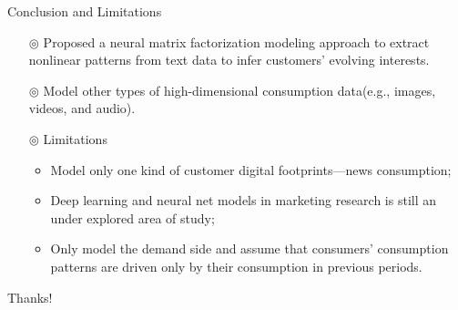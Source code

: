 \documentclass{beamer}
\begin{document}
\begin{frame}{Conclusion and Limitations}
	\begin{itemize}
		\item[$\circledcirc$] Proposed a neural matrix factorization modeling approach to extract nonlinear patterns from text data to infer customers' evolving interests.
		\item[$\circledcirc$] Model other types of high-dimensional consumption data(e.g., images, videos, and audio).
		\item[$\circledcirc$] Limitations
		      \begin{itemize}
			      \item Model only one kind of customer digital footprints—news consumption\citep{trusov2016crumbs};
			      \item Deep learning and neural net models in marketing research is still an under explored area of study;
			      \item Only model the demand side and assume that consumers' consumption patterns are driven only by their consumption in previous periods.
		      \end{itemize}
	\end{itemize}
\end{frame}


\begin{frame}
	\begin{center}
		{\Huge\calligra Thanks!}
	\end{center}
\end{frame}

% 	
% 	
\end{document}
